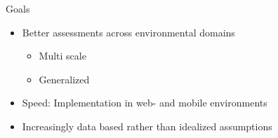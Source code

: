 \documentclass[
	10pt, %
]{beamer}
\begin{document}
\begin{frame}
	{\large Goals} 
	\begin{itemize}
		\item Better assessments across environmental domains
		\begin{itemize}
			\item Multi scale 
			\item Generalized 
		\end{itemize}
		\item Speed: Implementation in web- and mobile environments  
		\item Increasingly data based rather than idealized assumptions 
	\end{itemize}

\end{frame}
\end{document}
